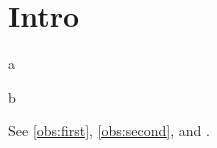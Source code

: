 \section{Intro}
\begin{oblemma}\label{obs:first}
a
\end{oblemma}
\begin{obcor}\label{obs:second}
b
\end{obcor}
See \autoref{obs:first}, \autoref{obs:second}, and .
